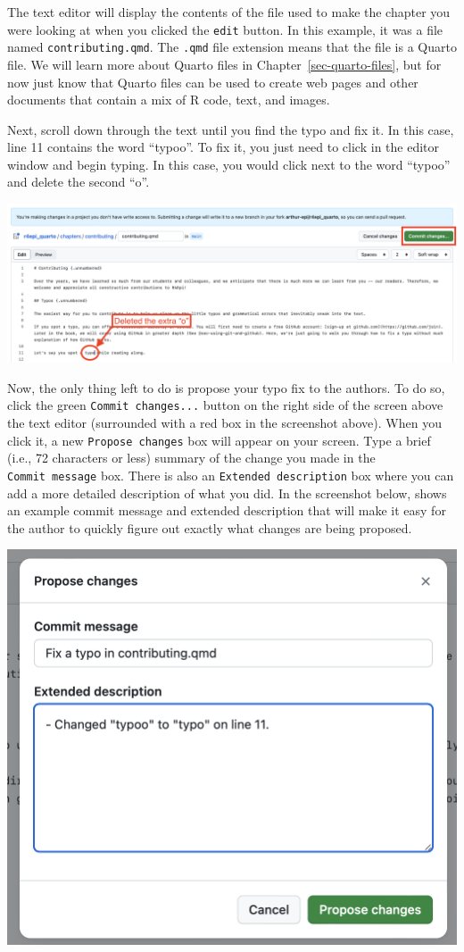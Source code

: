 \documentclass[
  letterpaper,
  DIV=11,
  numbers=noendperiod]{scrreprt}
\begin{document}
The text editor will display the contents of the file used to make the
chapter you were looking at when you clicked the \texttt{edit} button.
In this example, it was a file named \texttt{contributing.qmd}. The
\texttt{.qmd} file extension means that the file is a Quarto file. We
will learn more about Quarto files in Chapter~\ref{sec-quarto-files},
but for now just know that Quarto files can be used to create web pages
and other documents that contain a mix of R code, text, and images.

Next, scroll down through the text until you find the typo and fix it.
In this case, line 11 contains the word ``typoo''. To fix it, you just
need to click in the editor window and begin typing. In this case, you
would click next to the word ``typoo'' and delete the second ``o''.

\includegraphics{chapters/contributing/fix_typo.png}

Now, the only thing left to do is propose your typo fix to the authors.
To do so, click the green \texttt{Commit\ changes...} button on the
right side of the screen above the text editor (surrounded with a red
box in the screenshot above). When you click it, a new
\texttt{Propose\ changes} box will appear on your screen. Type a brief
(i.e., 72 characters or less) summary of the change you made in the
\texttt{Commit\ message} box. There is also an
\texttt{Extended\ description} box where you can add a more detailed
description of what you did. In the screenshot below, shows an example
commit message and extended description that will make it easy for the
author to quickly figure out exactly what changes are being proposed.

\includegraphics{chapters/contributing/propose_changes.png}
\end{document}
